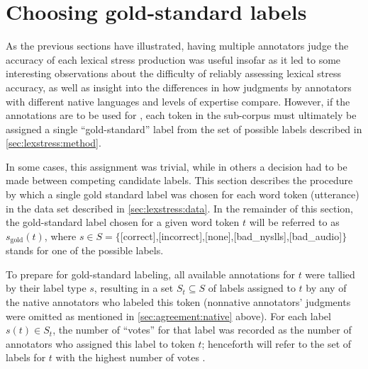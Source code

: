 			
			
		\section{Choosing gold-standard labels}
		\label{sec:agreement:gold}
		
		
		
		As the previous sections have illustrated, having multiple annotators judge the accuracy of each lexical stress production was useful insofar as it led to some interesting observations about the difficulty of reliably assessing lexical stress accuracy, as well as insight into the differences in how judgments by annotators with different native languages and levels of expertise compare. However, if the annotations are to be used for , each token in the sub-corpus must ultimately be assigned a single ``gold-standard'' label from the set of possible labels described in \cref{sec:lexstress:method}.
		
		In some cases, this assignment was trivial, while in others a decision had to be made between competing candidate labels. This section describes the procedure by which a single gold standard label was chosen for each word token (utterance) in the data set described in \cref{sec:lexstress:data}. In the remainder of this section, the gold-standard label chosen for a given word token $t$ will be referred to as $s_{\text{gold}}(t)$, where $s \in S = \{$[correct],{[incorrect]},{[none]},{[bad\_nyslls]},{[bad\_audio]}$\}$ stands for one of the possible labels.
		
		To prepare for gold-standard labeling, all available annotations for $t$ were tallied by their label type $s$, resulting in a set $S_t \subseteq S$ of labels assigned to $t$ by any of the native annotators who labeled this token (nonnative annotators' judgments were omitted as mentioned in \cref{sec:agreement:native} above). For each label $s(t) \in S_t$, the number of ``votes'' for that label was recorded as the number of annotators who assigned this label to token $t$; henceforth  will refer to the set of labels for $t$ with the highest number of votes .
		
